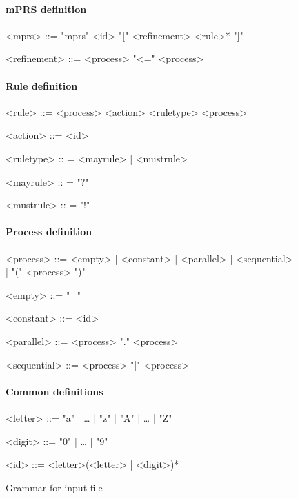 \begin{figure}
\paragraph{mPRS definition}
\begin{grammar}
<mprs> ::= "mprs" <id> "[" <refinement> <rule>* "]"

<refinement> ::= <process> "<=" <process>

\end{grammar}

\paragraph{Rule definition}
\begin{grammar}
<rule> ::= <process> <action> <ruletype> <process>

<action> ::= <id>

<ruletype> :: = <mayrule> | <mustrule>

<mayrule> :: = "?"

<mustrule> :: = "!"
\end{grammar}

\paragraph{Process definition}
\begin{grammar}
<process> ::= <empty> | <constant> | <parallel> | <sequential> | "(" <process> ")"

<empty> ::= "_"

<constant> ::= <id>

<parallel> ::= <process> "." <process>

<sequential> ::= <process> "|" <process>
\end{grammar}

\paragraph{Common definitions}
\begin{grammar}
<letter> ::= "a" | … | "z" | "A" | … | "Z"

<digit> ::= "0" | …  | "9"

<id> ::= <letter>(<letter> | <digit>)*
\end{grammar}
\label{fig:grammar}
\caption{Grammar for input file}
\end{figure}



